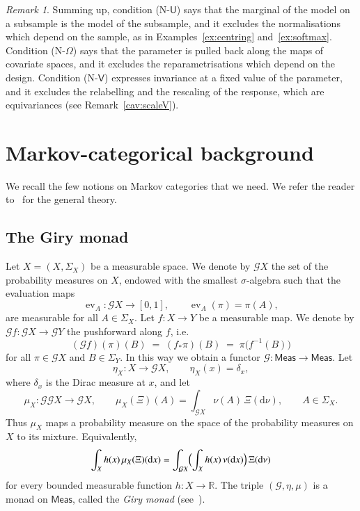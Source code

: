 \documentclass[11pt,a4paper]{article}
\theoremstyle{plain}
\theoremstyle{definition}
\theoremstyle{remark}
\newtheorem{remark}[theorem]{Remark}
\newcommand{\cat}[1]{\mathsf{#1}}
\newcommand{\catU}{\cat{U}}
\newcommand{\catV}{\cat{V}}
\newcommand{\catO}{\cat{\Omega}}
\newcommand{\Meas}{\cat{Meas}}
\newcommand{\G}{\mathcal{G}}
\newcommand{\R}{\mathbb{R}}
\begin{document}
\begin{remark}\label{rem:slots}
Summing up, condition (N-$\catU$) says that the marginal of the model on a
subsample is the model of the subsample, and it excludes the normalisations
which depend on the sample, as in Examples~\ref{ex:centring}
and~\ref{ex:softmax}. Condition (N-$\catO$) says that the parameter is pulled
back along the maps of covariate spaces, and it excludes the
reparametrisations which depend on the design. Condition (N-$\catV$) expresses
invariance at a fixed value of the parameter, and it excludes the relabelling
and the rescaling of the response, which are equivariances (see
Remark~\ref{cav:scaleV}).
\end{remark}
\section{Markov-categorical background}\label{sec:markov}

We recall the few notions on Markov categories that we need. We refer the
reader to~\cite{fritz_synthetic_2020,perrone_markov_2024} for the general
theory.

\subsection{The Giry monad}

Let $X=(X,\Sigma_X)$ be a measurable space. We denote by $\G X$ the set of the
probability measures on $X$, endowed with the smallest $\sigma$-algebra such
that the evaluation maps
\[
\operatorname{ev}_A \colon \G X\to [0,1],
\qquad
\operatorname{ev}_A(\pi)=\pi(A),
\]
are measurable for all $A\in\Sigma_X$. Let $f \colon X\to Y$ be a measurable
map. We denote by $\G f \colon \G X\to \G Y$ the pushforward along $f$, i.e.
\[
(\G f)(\pi)(B) \;=\; (f_\ast\pi)(B) \;=\; \pi\bigl(f^{-1}(B)\bigr)
\]
for all $\pi \in \G X$ and $B\in\Sigma_Y$. In this way we obtain a functor
$\G \colon \Meas\to\Meas$. Let
\[
\eta_X \colon X\to \G X,
\qquad
\eta_X(x)=\delta_x,
\]
where $\delta_x$ is the Dirac measure at $x$, and let
\[
\mu_X \colon \G\G X\to\G X,
\qquad
\mu_X(\Xi)(A) = \int_{\G X}\nu(A)\,\Xi(\mathrm{d}\nu),
\qquad
A\in\Sigma_X.
\]
Thus $\mu_X$ maps a probability measure on the space of the probability
measures on $X$ to its mixture. Equivalently,
\[
\int_X h(x)\,\mu_X(\Xi)(\mathrm{d}x)
=
\int_{\G X}
\Bigl(
\int_X h(x)\,\nu(\mathrm{d}x)
\Bigr)\,
\Xi(\mathrm{d}\nu)
\]
for every bounded measurable function $h \colon X\to\R$. The triple
$(\G,\eta,\mu)$ is a monad on $\Meas$, called the \emph{Giry monad}
(see~\cite{giry_categorical_1982}).
\end{document}
